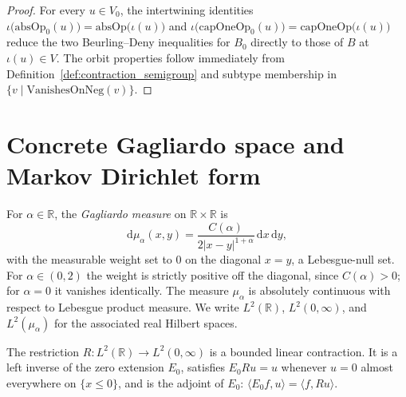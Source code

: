 \begin{proof}
\leanok
For every $u \in V_0$, the intertwining identities $\iota\bigl(\mathrm{absOp}_0(u)\bigr) = \mathrm{absOp}\bigl(\iota(u)\bigr)$ and $\iota\bigl(\mathrm{capOneOp}_0(u)\bigr) = \mathrm{capOneOp}\bigl(\iota(u)\bigr)$ reduce the two Beurling--Deny inequalities for $B_0$ directly to those of $B$ at $\iota(u) \in V$. The orbit properties follow immediately from Definition~\ref{def:contraction_semigroup} and subtype membership in $\{v \mid \mathrm{VanishesOnNeg}(v)\}$.
\end{proof}

\section{Concrete Gagliardo space and Markov Dirichlet form}

\begin{definition}\label{def:gagliardo_measure}
\leanok
For $\alpha \in \mathbb{R}$, the \emph{Gagliardo measure} on $\mathbb{R} \times \mathbb{R}$ is
\[
  \mathrm{d}\mu_\alpha(x, y) = \frac{C(\alpha)}{2 \lvert x - y \rvert^{1 + \alpha}} \, \mathrm{d}x \, \mathrm{d}y,
\]
with the measurable weight set to $0$ on the diagonal $x = y$, a Lebesgue-null set. For $\alpha \in (0, 2)$ the weight is strictly positive off the diagonal, since $C(\alpha) > 0$; for $\alpha = 0$ it vanishes identically. The measure $\mu_\alpha$ is absolutely continuous with respect to Lebesgue product measure. We write $L^2(\mathbb{R})$, $L^2(0, \infty)$, and $L^2(\mu_\alpha)$ for the associated real Hilbert spaces.
\end{definition}

\begin{lemma}\label{lem:rest_ioi_real}
\leanok
The restriction $R : L^2(\mathbb{R}) \to L^2(0, \infty)$ is a bounded linear contraction. It is a left inverse of the zero extension $E_0$, satisfies $E_0 R u = u$ whenever $u = 0$ almost everywhere on $\{x \le 0\}$, and is the adjoint of $E_0$: $\langle E_0 f, u \rangle = \langle f, R u \rangle$.
\end{lemma}

